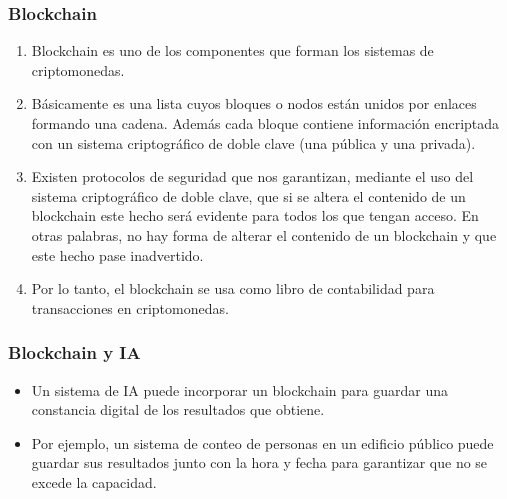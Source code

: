 \documentclass[11pt]{beamer}
\begin{document}
    \begin{frame}
	\frametitle{Blockchain}
	\begin{enumerate}
		\item Blockchain es uno de los componentes que forman los sistemas de criptomonedas. 
		\item Básicamente es una lista cuyos bloques o nodos están unidos por enlaces formando una cadena. Además cada bloque contiene información encriptada con un sistema criptográfico de doble clave (una pública y una privada).
		\item Existen protocolos de seguridad que nos garantizan, mediante el uso del sistema criptográfico de doble clave, que si se altera el contenido de un blockchain este hecho será evidente para todos los que tengan acceso. En otras palabras, no hay forma de alterar el contenido de un blockchain y que este hecho pase inadvertido.
		\item Por lo tanto, el blockchain se usa como libro de contabilidad para transacciones en criptomonedas.
	\end{enumerate}
    \end{frame}
    \begin{frame}
    	\frametitle{Blockchain y IA}
    	\begin{itemize}
    		\item Un sistema de IA puede incorporar un blockchain para guardar una constancia digital de los resultados que obtiene.
    		\item Por ejemplo, un sistema de conteo de personas en un edificio público puede guardar sus resultados junto con la hora y fecha para garantizar que no se excede la capacidad.
    	\end{itemize}
    \end{frame}
\end{document}
